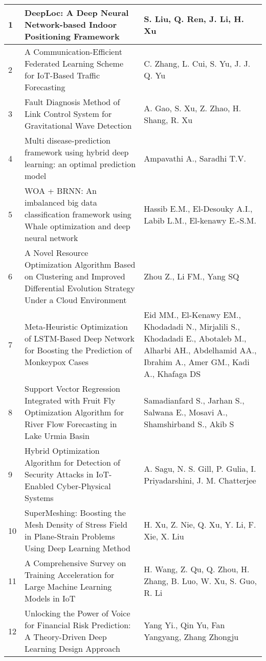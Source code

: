 \begin{landscape}
\begin{longtable}{|p{0.5cm}|p{9cm}|p{7cm}|}
    1 & DeepLoc: A Deep Neural Network-based Indoor Positioning Framework & S. Liu, Q. Ren, J. Li, H. Xu \\
    \hline
    2 & A Communication-Efficient Federated Learning Scheme for IoT-Based Traffic Forecasting & C. Zhang, L. Cui, S. Yu, J. J. Q. Yu \\
    \hline
    3 & Fault Diagnosis Method of Link Control System for Gravitational Wave Detection & A. Gao, S. Xu, Z. Zhao, H. Shang, R. Xu \\
    \hline
    4 & Multi disease-prediction framework using hybrid deep learning: an optimal prediction model & Ampavathi A., Saradhi T.V. \\
    \hline
    5 & WOA + BRNN: An imbalanced big data classification framework using Whale optimization and deep neural network & Hassib E.M., El-Desouky A.I., Labib L.M., El-kenawy E.-S.M. \\
    \hline
    6 & A Novel Resource Optimization Algorithm Based on Clustering and Improved Differential Evolution Strategy Under a Cloud Environment & Zhou Z., Li FM., Yang SQ \\
    \hline
    7 & Meta-Heuristic Optimization of LSTM-Based Deep Network for Boosting the Prediction of Monkeypox Cases & Eid MM., El-Kenawy EM., Khodadadi N., Mirjalili S., Khodadadi E., Abotaleb M., Alharbi AH., Abdelhamid AA., Ibrahim A., Amer GM., Kadi A., Khafaga DS \\
    \hline
    8 & Support Vector Regression Integrated with Fruit Fly Optimization Algorithm for River Flow Forecasting in Lake Urmia Basin & Samadianfard S., Jarhan S., Salwana E., Mosavi A., Shamshirband S., Akib S \\
    \hline
    9 & Hybrid Optimization Algorithm for Detection of Security Attacks in IoT-Enabled Cyber-Physical Systems & A. Sagu, N. S. Gill, P. Gulia, I. Priyadarshini, J. M. Chatterjee \\
    \hline
    10 & SuperMeshing: Boosting the Mesh Density of Stress Field in Plane-Strain Problems Using Deep Learning Method & H. Xu, Z. Nie, Q. Xu, Y. Li, F. Xie, X. Liu \\
    \hline
    11 & A Comprehensive Survey on Training Acceleration for Large Machine Learning Models in IoT & H. Wang, Z. Qu, Q. Zhou, H. Zhang, B. Luo, W. Xu, S. Guo, R. Li \\
    \hline
    12 & Unlocking the Power of Voice for Financial Risk Prediction: A Theory-Driven Deep Learning Design Approach & Yang Yi., Qin Yu, Fan Yangyang, Zhang Zhongju \\

\end{longtable}
\end{landscape}
